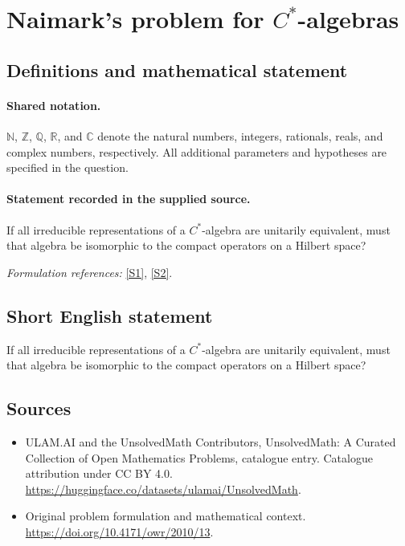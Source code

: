 \documentclass[11pt]{article}
\newcommand{\sref}[2]{\hyperlink{source:#1:#2}{[S#2]}}
\begin{document}
\section{\texorpdfstring{Naimark's problem for $C^*$-algebras}{Naimark's problem for C\textasciicircum{}*-algebras}}\label{statement}

\subsection{Definitions and mathematical statement}

\paragraph{Shared notation.}$\mathbb N$, $\mathbb Z$, $\mathbb Q$, $\mathbb R$, and $\mathbb C$ denote the natural numbers, integers, rationals, reals, and complex numbers, respectively. All additional parameters and hypotheses are specified in the question.


\paragraph{Statement recorded in the supplied source.}
If all irreducible representations of a $C^*$-algebra are unitarily equivalent, must that algebra be isomorphic to the compact operators on a Hilbert space?
\par\smallskip\textit{Formulation references:} \sref{statement}{1}, \sref{statement}{2}.
\subsection{Short English statement}
If all irreducible representations of a $C^*$-algebra are unitarily equivalent, must that algebra be isomorphic to the compact operators on a Hilbert space?
\subsection{Sources}
\begin{itemize}
\item[\hypertarget{source:statement:1}{S1}] ULAM.AI and the UnsolvedMath Contributors, UnsolvedMath: A Curated Collection of Open Mathematics Problems, catalogue entry. Catalogue attribution under CC BY 4.0.
\url{https://huggingface.co/datasets/ulamai/UnsolvedMath}.
\item[\hypertarget{source:statement:2}{S2}] Original problem formulation and mathematical context.
\url{https://doi.org/10.4171/owr/2010/13}.
\end{itemize}
\label{end:statement}
\end{document}
